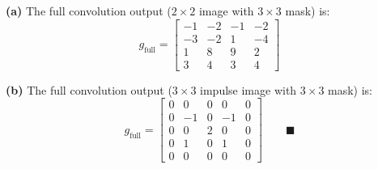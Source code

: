 \documentclass[12pt]{article}
\begin{document}
\begin{resultsbox}
\textbf{(a)} The full convolution output ($2\times2$ image with $3\times3$ mask) is:
\[
g_{\text{full}}=
\begin{bmatrix}
-1 & -2 & -1 & -2 \\
-3 & -2 & 1 & -4 \\
1 & 8 & 9 & 2 \\
3 & 4 & 3 & 4
\end{bmatrix}
\]

\textbf{(b)} The full convolution output ($3\times3$ impulse image with $3\times3$ mask) is:
\[
g_{\text{full}}=
\begin{bmatrix}
0 & 0 & 0 & 0 & 0 \\
0 & -1 & 0 & -1 & 0 \\
0 & 0 & 2 & 0 & 0 \\
0 & 1 & 0 & 1 & 0 \\
0 & 0 & 0 & 0 & 0
\end{bmatrix}
\qquad \blacksquare
\]
\end{resultsbox}


\end{document}
